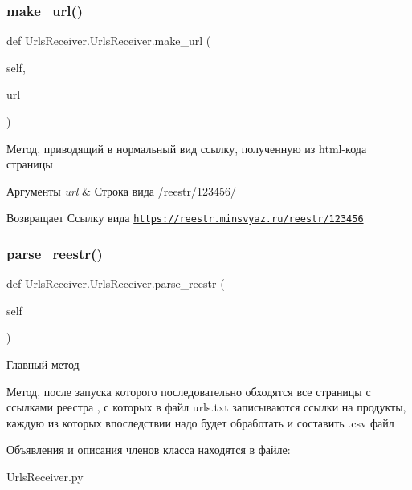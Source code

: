 \subsubsection{\texorpdfstring{make\+\_\+url()}{make\_url()}}
{\footnotesize\ttfamily def Urls\+Receiver.\+Urls\+Receiver.\+make\+\_\+url (\begin{DoxyParamCaption}\item[{}]{self,  }\item[{}]{url }\end{DoxyParamCaption})}



Метод, приводящий в нормальный вид ссылку, полученную из html-\/кода страницы 


\begin{DoxyParams}{Аргументы}
{\em url} & Строка вида {\ttfamily /reestr/123456/} \\
\hline
\end{DoxyParams}
\begin{DoxyReturn}{Возвращает}
Ссылку вида {\ttfamily \href{https://reestr.minsvyaz.ru/reestr/123456}{\tt https\+://reestr.\+minsvyaz.\+ru/reestr/123456}} 
\end{DoxyReturn}
\mbox{\label{classUrlsReceiver_1_1UrlsReceiver_abf0eed73148dbb302da0b4a09efb4940}} 
\subsubsection{\texorpdfstring{parse\+\_\+reestr()}{parse\_reestr()}}
{\footnotesize\ttfamily def Urls\+Receiver.\+Urls\+Receiver.\+parse\+\_\+reestr (\begin{DoxyParamCaption}\item[{}]{self }\end{DoxyParamCaption})}



Главный метод 

Метод, после запуска которого последовательно обходятся все страницы с ссылками реестра , с которых в файл {\ttfamily urls.\+txt} записываются ссылки на продукты, каждую из которых впоследствии надо будет обработать и составить {\ttfamily .csv} файл 

Объявления и описания членов класса находятся в файле\+:\begin{DoxyCompactItemize}
\item 
Urls\+Receiver.\+py\end{DoxyCompactItemize}
